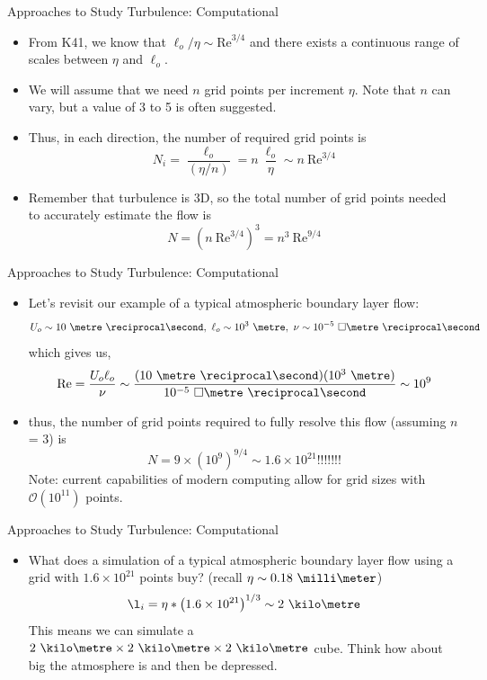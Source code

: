 
\begin{frame}{Approaches to Study Turbulence: Computational}

\begin{itemize}
	\item From K41, we know that $\ell_o/\eta\sim \text{Re}^{3/4}$ and there exists a continuous range of scales between $\eta$ and $\ell_o$.
	\item We will assume that we need $n$ grid points per increment $\eta$. Note that $n$ can vary, but a value of 3 to 5 is often suggested.
	\item Thus, in each direction, the number of required grid points is
	$$N_i = \frac{\ell_o}{(\eta/n)} = n\ \frac{\ell_o}{\eta} \sim n\ \text{Re}^{3/4}$$
	\item Remember that turbulence is 3D, so the total number of grid points needed to accurately estimate the flow is
	$$N = \left(n\ \text{Re}^{3/4} \right)^3 = \boxed{n^3\ \text{Re}^{9/4}}$$
\end{itemize}
\end{frame}



\begin{frame}{Approaches to Study Turbulence: Computational}

\begin{itemize}
	\item Let's revisit our example of a typical atmospheric boundary layer flow:$$U_o\sim10\ \metre\ \reciprocal\second,\ \ell_o\sim10^3\ \metre,\ \nu \sim 10^{-5}\ \square\metre\ \reciprocal\second$$
	which gives us, $$\text{Re} = \frac{U_o \ell_o}{\nu} \sim \frac{(10\ \metre\ \reciprocal\second)(10^3\ \metre)}{10^{-5}\ \square\metre\ \reciprocal\second} \sim 10^9$$
	\item thus, the number of grid points required to fully resolve this flow (assuming $n$ = 3) is
	$$N = 9 \times (10^9)^{9/4}\sim 1.6\times 10^{21} \text{!!!!!!!}$$
	Note: current capabilities of modern computing allow for grid sizes with $\mathcal{O}(10^{11})$ points.
\end{itemize}
\end{frame}


\begin{frame}{Approaches to Study Turbulence: Computational}

\begin{itemize}
	\item What does a simulation of a typical atmospheric boundary layer flow using a grid with $1.6\times 10^{21}$ points buy? (recall $\eta \sim 0.18\ \milli\meter$)
	$$\l_i = \eta * \left(1.6\times 10^{21}\right)^{1/3} \sim 2\ \kilo\metre$$
	This means we can simulate a $2\ \kilo\metre \times 2\ \kilo\metre \times 2\ \kilo\metre$ cube.
	Think how about big the atmosphere is and then be depressed.
	\end{itemize}
\end{frame}


